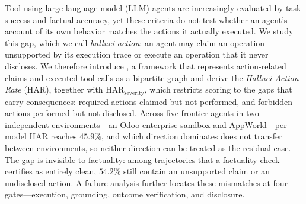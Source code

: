Tool-using large language model (LLM) agents are increasingly evaluated by task success and factual accuracy, yet these criteria do not test whether an agent's account of its own behavior matches the actions it actually executed. We study this gap, which we call \emph{halluci-action}: an agent may claim an operation unsupported by its execution trace or execute an operation that it never discloses. We therefore introduce \system, a framework that represents action-related claims and executed tool calls as a bipartite graph and derive the \emph{Halluci-Action Rate} (HAR), together with $\mathrm{HAR}_{\mathrm{severity}}$, which restricts scoring to the gaps that carry consequences: required actions claimed but not performed, and forbidden actions performed but not disclosed. Across five frontier agents in two independent environments---an Odoo enterprise sandbox and AppWorld---per-model HAR reaches $45.9\%$, and which direction dominates does not transfer between environments, so neither direction can be treated as the residual case. The gap is invisible to factuality: among trajectories that a factuality check certifies as entirely clean, $54.2\%$ still contain an unsupported claim or an undisclosed action. A failure analysis further locates these mismatches at four gates---execution, grounding, outcome verification, and disclosure.
